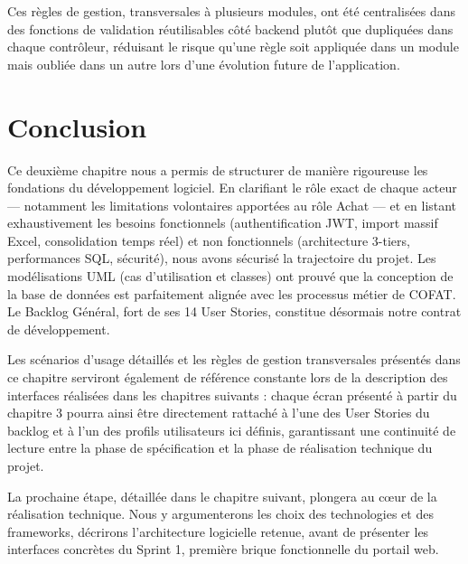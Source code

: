 Ces règles de gestion, transversales à plusieurs modules, ont été centralisées dans des fonctions de validation réutilisables côté backend plutôt que dupliquées dans chaque contrôleur, réduisant le risque qu'une règle soit appliquée dans un module mais oubliée dans un autre lors d'une évolution future de l'application.

\section{Conclusion}
Ce deuxième chapitre nous a permis de structurer de manière rigoureuse les fondations du développement logiciel. En clarifiant le rôle exact de chaque acteur — notamment les limitations volontaires apportées au rôle Achat — et en listant exhaustivement les besoins fonctionnels (authentification JWT, import massif Excel, consolidation temps réel) et non fonctionnels (architecture 3-tiers, performances SQL, sécurité), nous avons sécurisé la trajectoire du projet. Les modélisations UML (cas d'utilisation et classes) ont prouvé que la conception de la base de données est parfaitement alignée avec les processus métier de COFAT. Le Backlog Général, fort de ses 14 User Stories, constitue désormais notre contrat de développement.

Les scénarios d'usage détaillés et les règles de gestion transversales présentés dans ce chapitre serviront également de référence constante lors de la description des interfaces réalisées dans les chapitres suivants : chaque écran présenté à partir du chapitre 3 pourra ainsi être directement rattaché à l'une des User Stories du backlog et à l'un des profils utilisateurs ici définis, garantissant une continuité de lecture entre la phase de spécification et la phase de réalisation technique du projet.

La prochaine étape, détaillée dans le chapitre suivant, plongera au cœur de la réalisation technique. Nous y argumenterons les choix des technologies et des frameworks, décrirons l'architecture logicielle retenue, avant de présenter les interfaces concrètes du Sprint 1, première brique fonctionnelle du portail web.
